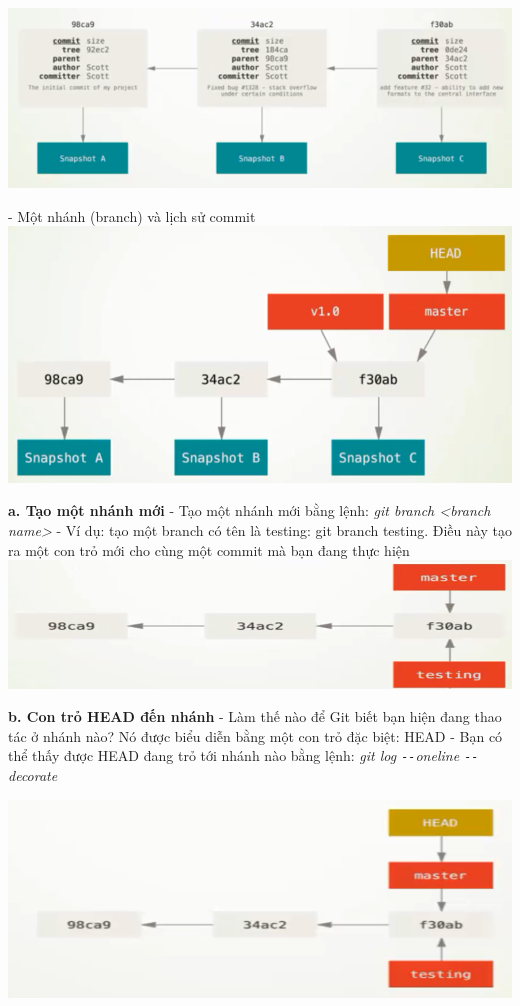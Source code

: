 \documentclass[12pt,a4paper]{report}
\begin{document}
	\includegraphics[width=0.8\linewidth]{screenshot049}
	
	\label{fig:screenshot049}
\vskip 0.4cm\vskip 0.4cm
- Một nhánh (branch) và lịch sử commit 	
\vskip 0.4cm
	\includegraphics[width=0.8\linewidth]{screenshot050}

	\label{fig:screenshot050}
\vskip 0.4cm\vskip 0.4cm
{\bf a. Tạo một nhánh mới}\vskip 0.4cm
- Tạo một nhánh mới bằng lệnh: {\it git branch <branch name>}\vskip 0.4cm
- Ví dụ: tạo một branch có tên là testing: git branch testing. Điều này tạo ra một con trỏ mới cho cùng một commit mà bạn đang thực hiện
\vskip 0.4cm
	\includegraphics[width=0.8\linewidth]{screenshot051}

	\label{fig:screenshot051}
\vskip 0.4cm\vskip 0.4cm
{\bf b. Con trỏ HEAD đến nhánh}\vskip 0.4cm
- Làm thế nào để Git biết bạn hiện đang thao tác ở nhánh nào? Nó được biểu diễn bằng một con trỏ đặc biệt: HEAD\vskip 0.4cm
- Bạn có thể thấy được HEAD đang trỏ tới nhánh nào bằng lệnh: {\it git log \texttt{-{}-}oneline \texttt{-{}-}decorate}\vskip 0.4cm

	\includegraphics[width=0.8\linewidth]{screenshot052}
	
\end{document}
